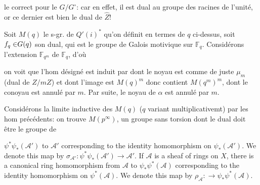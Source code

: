 

le  correct pour le $G/G^\circ$: car en effet, il est dual au groupe des racines de l'unité, or ce dernier est bien le dual de $\widehat Z$!


Soit $M(q)$ le s-gr. de $Q'(i)^*$ qu'on définit en termes de $q$ ci-dessus, soit  ${f_q\in}G(q)$ son dual, qui est le groupe de Galois motivique sur $\mathbb F_q$. Considérons l'extension $\mathbb F_{q^m}$ de $\mathbb F_q$, d'où


 on voit que l'hom désigné \unsure{$\alpha$} est induit par
dont le noyau est comme de juste  $\mu_m$ (dual de $Z/mZ$) et dont l'image est $M(q)^m$ donc contient $M(q^m)^m$, dont le conoyau est annulé par $m$. Par suite, le  noyau de $\alpha$ est annulé par $m$.

 Considérons la limite inductive des $M(q)$ ($q$ variant multiplicativemt) par les hom précédents: on trouve $M(p^\infty)$, un groupe sans torsion dont le dual doit être le groupe de



$\psi^*\psi_*(\mathcal A')$ to $\mathcal A'$ corresponding to the identity homomorphism on $\psi_*(\mathcal A')$. We denote this map by $\sigma_{\mathcal A'}:\psi^*\psi_*(\mathcal A')\to\mathcal A'$. If $\mathcal A$ is a sheaf of rings on $X$, there is a canonical ring homomorphism from $\mathcal A$ to $\psi_*\psi^*(\mathcal A)$ corresponding to the identity homomorphism on $\psi^*(\mathcal A)$. We denote this map by $\rho_{\mathcal A}:\to\psi_*\psi^*(\mathcal A)$.

